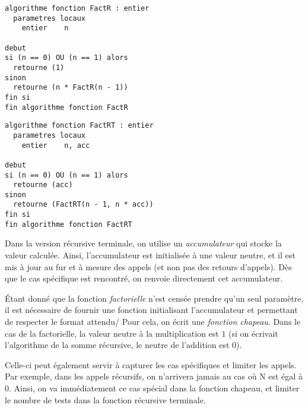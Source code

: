 \documentclass[11pt,a4paper]{article}
\begin{document}
\begin{table}[!ht]
  \centering
  \begin{minipage}{0.475\textwidth}
    \centering
\begin{lstlisting}[style=algorithmique]
algorithme fonction FactR : entier
  parametres locaux
    entier    n

debut
si (n == 0) OU (n == 1) alors
  retourne (1)
sinon
  retourne (n * FactR(n - 1))
fin si
fin algorithme fonction FactR \end{lstlisting}
  \end{minipage}
  \hfillx
  \begin{minipage}{0.48\textwidth}
    \centering
\begin{lstlisting}[style=algorithmique]
algorithme fonction FactRT : entier
  parametres locaux
    entier    n, acc

debut
si (n == 0) OU (n == 1) alors
  retourne (acc)
sinon
  retourne (FactRT(n - 1, n * acc))
fin si
fin algorithme fonction FactRT \end{lstlisting}
  \end{minipage}
\end{table}

Dans la version récursive terminale, on utilise un \textit{accumulateur} qui stocke la valeur calculée.
Ainsi, l'accumulateur est initialisée à une valeur neutre, et il est mis à jour au fur et à mesure des appels (et non pas des retours d'appels).
Dès que le cas spécifique est rencontré, on renvoie directement cet accumulateur.

\medskip

\'Etant donné que la fonction \textit{factorielle} n'est censée prendre qu'un seul paramètre, il est nécessaire de fournir une fonction initialisant l'accumulateur et permettant de respecter le format attendu/
Pour cela, on écrit une \textit{fonction chapeau}.
Dans le cas de la factorielle, la valeur neutre à la multiplication est $ 1 $ (si on écrivait l'algorithme de la somme récursive, le neutre de l'addition est $ 0 $).

Celle-ci peut également servir à capturer les cas spécifiques et limiter les appels.
Par exemple, dans les appels récursifs, on n'arrivera jamais au cas où N est égal à $ 0 $.
Ainsi, on va immédiatement ce cas spécial dans la fonction chapeau, et limiter le nombre de tests dans la fonction récursive terminale.
\end{document}
